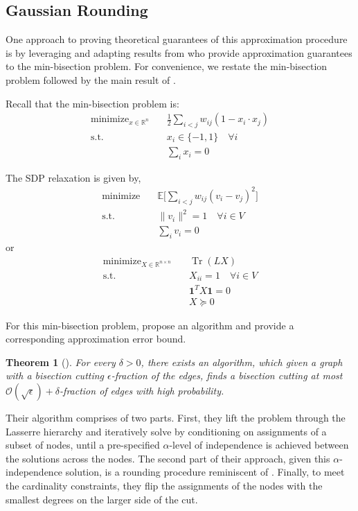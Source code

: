 \documentclass[12pt]{article}
\newtheorem{theorem}{Theorem}
\theoremstyle{definition}
\numberwithin{equation}{section}
\numberwithin{figure}{section}
\newcommand{\minimize}{\mathop{\mathrm{minimize}}}
\numberwithin{equation}{section}
\numberwithin{figure}{section}
\begin{document}
\subsection{Gaussian Rounding}

One approach to proving theoretical guarantees of this approximation procedure is by leveraging and adapting results from \citep{raghavendra2012approximating} who provide approximation guarantees to the min-bisection problem. For convenience, we restate the min-bisection problem followed by the main result of \citep{raghavendra2012approximating}.

Recall that the min-bisection problem is:
\begin{align*}
    \minimize_{x \in \mathbb{R}^n} \quad & \frac{1}{2} \sum_{i < j} w_{ij} (1 - x_i \cdot x_j) \\
    \text{s.t.} \quad & x_i \in \{ -1, 1 \} \quad \forall i \\
    & \sum_{i} x_i = 0
\end{align*}

The SDP relaxation is given by,
\begin{align*}
    \minimize \quad & \mathbb{E} \big[\sum_{i < j} w_{ij} (v_i - v_j)^2 \big] \\
    \text{s.t.} \quad & \| v_i\|^2 = 1 \quad \forall i \in V \\
    & \sum_{i} v_i = 0
\end{align*} or
\begin{align*}
    \minimize_{X\in\mathbb{R}^{n\times n}} \quad & \operatorname{Tr}(L X) \\
    \text{s.t.} \quad & X_{ii} = 1 \quad \forall i \in V \\
    & \mathbf{1}^T X \mathbf{1} = 0 \\
    &  X \succeq 0
\end{align*}

For this min-bisection problem, \citet{raghavendra2012approximating} propose an algorithm and provide a corresponding approximation error bound. 

\begin{theorem} [{\citealp[Theorem 1.2]{raghavendra2012approximating}}]
    For every $\delta > 0$, there exists an algorithm, which given a graph with a bisection cutting $\epsilon$-fraction of the edges, finds a bisection cutting at most $\mathcal{O}(\sqrt{\epsilon}) + \delta$-fraction of edges with high probability.
\end{theorem}


Their algorithm comprises of two parts. First, they lift the problem through the Lasserre hierarchy and iteratively solve by conditioning on assignments of a subset of nodes, until a pre-specified $\alpha$-level of independence is achieved between the solutions across the nodes. The second part of their approach, given this $\alpha$-independence solution, is a rounding procedure reminiscent of \citep{goemans1995improved}. Finally, to meet the cardinality constraints, they flip the assignments of the nodes with the smallest degrees on the larger side of the cut.
\end{document}
